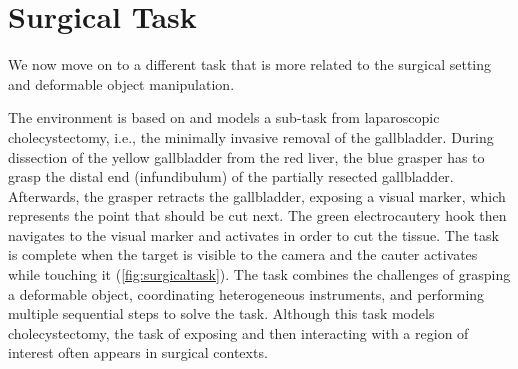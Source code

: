     

\section{Surgical Task}
We now move on to a different task that is more related to the surgical setting and
deformable object manipulation.


The environment is based on \cite{10.5555/3648699.3649067} and models a sub-task from laparoscopic cholecystectomy, i.e., 
the minimally invasive removal of the gallbladder. 
During dissection of the yellow gallbladder from the red liver, the blue
grasper has to grasp the distal end (infundibulum) of the partially 
resected gallbladder. Afterwards, the grasper retracts the gallbladder,
exposing a visual marker, which represents the point that should be
cut next. The green electrocautery hook then navigates to the visual
marker and activates in order to cut the tissue. The task is complete
when the target is visible to the camera and the cauter activates while
touching it (\cref{fig:surgicaltask}).
The task combines the challenges of grasping a deformable object, coordinating 
heterogeneous instruments, and performing multiple sequential steps to solve the task. Although
this task models cholecystectomy, the task of exposing
and then interacting with a region of interest often appears in surgical contexts.

